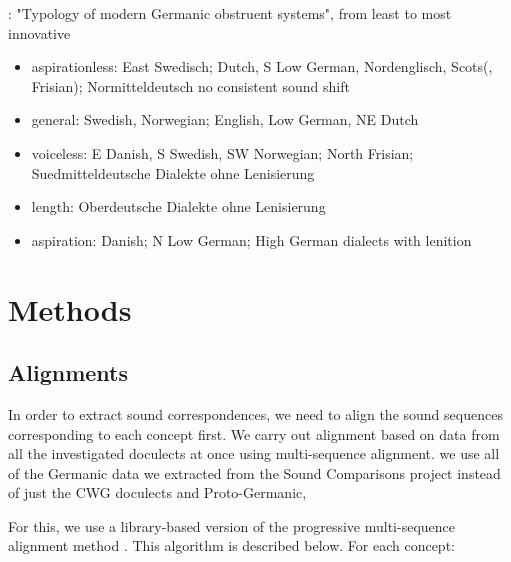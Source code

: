 \documentclass[a4paper]{article}
\begin{document}
\citet[pp. 215-235]{goblirsch2005lautverschiebungen}: "Typology of modern Germanic obstruent systems", from least to most innovative
\begin{itemize}
  \item aspirationless:
  East Swedisch; Dutch, S Low German, Nordenglisch, Scots(, Frisian); Normitteldeutsch
  no consistent sound shift
  \item general:
  Swedish, Norwegian; English, Low German, NE Dutch
  \item voiceless:
  E Danish, S Swedish, SW Norwegian; North Frisian; Suedmitteldeutsche Dialekte ohne Lenisierung
  \item length:
  Oberdeutsche Dialekte ohne Lenisierung
  \item aspiration:
  Danish; N Low German; High German dialects with lenition
\end{itemize}

\section{Methods}

\subsection{Alignments}
\label{s:alignments}

In order to extract sound correspondences, we need to align the sound sequences corresponding to each concept first.
We carry out alignment based on data from all the investigated doculects at once using multi-sequence alignment.
we use all of the Germanic data we extracted from the Sound Comparisons project instead of just the CWG doculects and Proto-Germanic,

For this, we use a library-based version \citep{notredame2000t-coffee:} of the progressive multi-sequence alignment method \citep{thompson1994clustal}.
This algorithm is described below.
For each concept:

\end{document}
